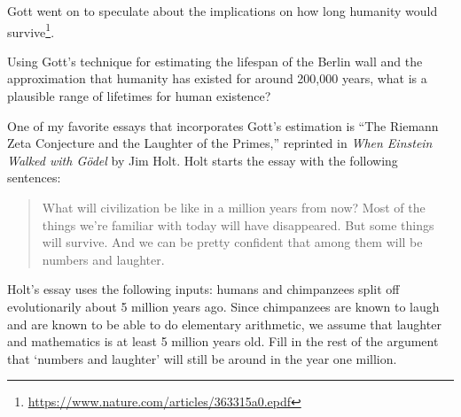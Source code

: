 Gott went on to speculate about the implications on how long humanity would survive\footnote{\url{https://www.nature.com/articles/363315a0.epdf}}.
\begin{exercise}
Using Gott's technique for estimating the lifespan of the Berlin wall and the approximation that humanity has existed for around 200,000 years, what is a plausible range of lifetimes for human existence?
\end{exercise}
One of my favorite essays that incorporates Gott's estimation is ``The Riemann Zeta Conjecture and the Laughter of the Primes,'' reprinted in \emph{When Einstein Walked with G\"odel} by Jim Holt. Holt starts the essay with the following sentences:
\begin{quote}
	What will civilization be like in a million years from now? Most of the things we're familiar with today will have disappeared. But some things will survive. And we can be pretty confident that among them will be numbers and laughter.
\end{quote}
\begin{exercise}
Holt's essay uses the following inputs: humans and chimpanzees split off evolutionarily about 5 million years ago. Since chimpanzees are known to laugh and are known to be able to do elementary arithmetic, we assume that laughter and mathematics is at least 5 million years old. Fill in the rest of the argument that `numbers and laughter' will still be around in the year one million.
\end{exercise}